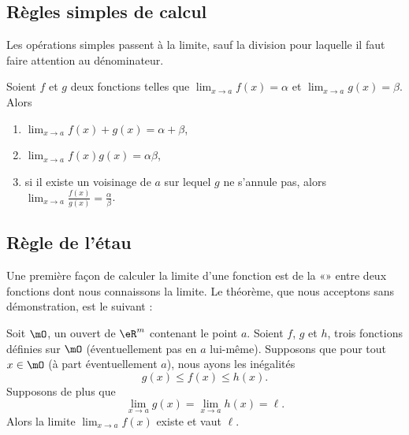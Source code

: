 
\subsection{Règles simples de calcul}

Les opérations simples passent à la limite, sauf la division pour laquelle il faut faire attention au dénominateur.
\begin{proposition}     \label{PropOpsSimplesLimites}
    Soient \( f\) et \( g\) deux fonctions telles que \( \lim_{x\to a} f(x)=\alpha\) et \( \lim_{x\to a} g(x)=\beta\). Alors
    \begin{enumerate}
        \item
            \( \lim_{x\to a} f(x)+g(x)=\alpha+\beta\),
        \item
            \( \lim_{x\to a} f(x)g(x)=\alpha\beta\),
        \item
            si il existe un voisinage de \( a\) sur lequel \( g\) ne s'annule pas, alors \( \lim_{x\to a} \frac{ f(x) }{ g(x) }=\frac{ \alpha }{ \beta }\).
    \end{enumerate}
\end{proposition}

\subsection{Règle de l'étau}

Une première façon de calculer la limite d'une fonction est de la «» entre deux fonctions dont nous connaissons la limite. Le théorème, que nous acceptons sans démonstration, est le suivant :
\begin{theorem}		\label{ThoRegleEtau}
	Soit $\mO$, un ouvert de $\eR^m$ contenant le point $a$. Soient $f$, $g$ et $h$, trois fonctions définies sur $\mO$ (éventuellement pas en $a$ lui-même). Supposons que pour tout $x\in\mO$ (à part éventuellement $a$), nous ayons les inégalités
	\begin{equation}
		g(x)\leq f(x)\leq h(x).
	\end{equation}
	Supposons de plus que
	\begin{equation}
		\lim_{x\to a} g(x)=\lim_{x\to a} h(x)=\ell.
	\end{equation}
	Alors la limite $\lim_{x\to a} f(x)$ existe et vaut $\ell$.
\end{theorem}


